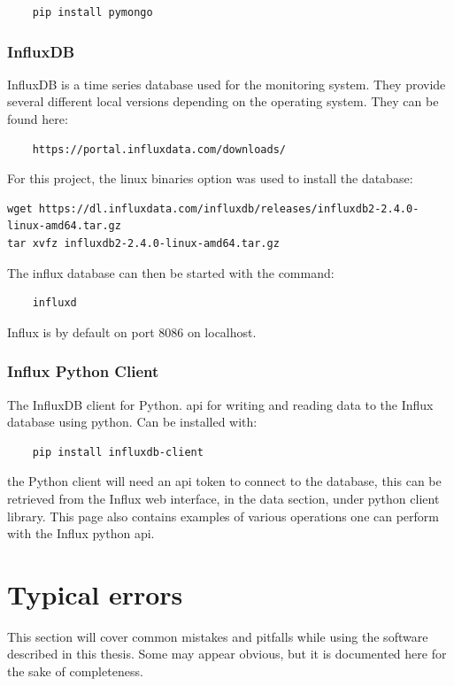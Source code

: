 \documentclass[main.tex]{subfiles}
\begin{document}
\begin{verbatim}
    pip install pymongo
\end{verbatim}

\subsubsection{InfluxDB}

InfluxDB is a time series database used for the monitoring system. They provide several different local versions depending on the operating system. They can be found here:
\begin{verbatim}
    https://portal.influxdata.com/downloads/
\end{verbatim}

For this project, the linux binaries option was used to install the database:
\begin{verbatim}
wget https://dl.influxdata.com/influxdb/releases/influxdb2-2.4.0-linux-amd64.tar.gz
tar xvfz influxdb2-2.4.0-linux-amd64.tar.gz
\end{verbatim}

The influx database can then be started with the command:

\begin{verbatim}
    influxd
\end{verbatim}

Influx is by default on port 8086 on localhost.

\subsubsection{Influx Python Client}
The InfluxDB client for Python. \gls{api} for writing and reading data to the Influx database using python. Can be installed with:

\begin{verbatim}
    pip install influxdb-client
\end{verbatim}

the Python client will need an \gls{api} token to connect to the database, this can be retrieved from the Influx web interface, in the data section, under python client library. This page also contains examples of various operations one can perform with the Influx python \gls{api}.
\newpage
\section{Typical errors}

This section will cover common mistakes and pitfalls while using the software described in this thesis. Some may appear obvious, but it is documented here for the sake of completeness.
\end{document}
